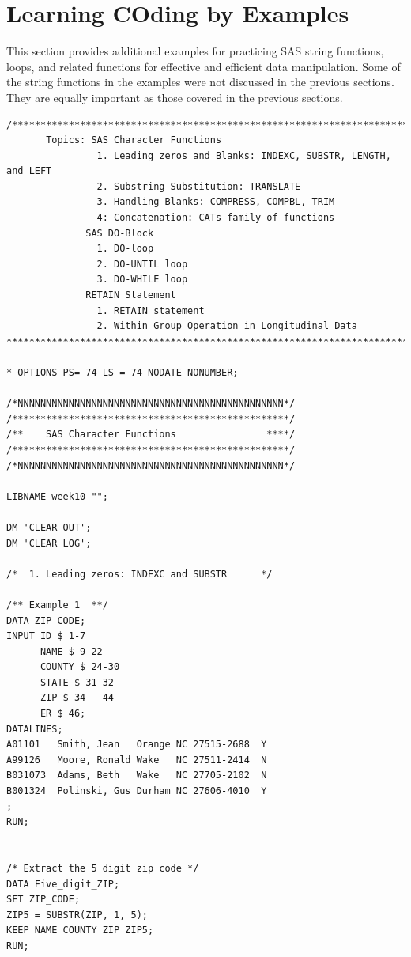 \documentclass[
]{book}
\begin{document}
\hypertarget{learning-coding-by-examples-6}{%
\section{Learning COding by Examples}\label{learning-coding-by-examples-6}}

This section provides additional examples for practicing SAS string functions, loops, and related functions for effective and efficient data manipulation. Some of the string functions in the examples were not discussed in the previous sections. They are equally important as those covered in the previous sections.

\begin{verbatim}
/******************************************************************************
       Topics: SAS Character Functions
                1. Leading zeros and Blanks: INDEXC, SUBSTR, LENGTH, and LEFT
                2. Substring Substitution: TRANSLATE
                3. Handling Blanks: COMPRESS, COMPBL, TRIM
                4: Concatenation: CATs family of functions
              SAS DO-Block
                1. DO-loop
                2. DO-UNTIL loop
                3. DO-WHILE loop
              RETAIN Statement
                1. RETAIN statement
                2. Within Group Operation in Longitudinal Data
*****************************************************************************/

* OPTIONS PS= 74 LS = 74 NODATE NONUMBER;

/*NNNNNNNNNNNNNNNNNNNNNNNNNNNNNNNNNNNNNNNNNNNNNNN*/
/*************************************************/
/**    SAS Character Functions                ****/
/*************************************************/
/*NNNNNNNNNNNNNNNNNNNNNNNNNNNNNNNNNNNNNNNNNNNNNNN*/

LIBNAME week10 "";

DM 'CLEAR OUT';
DM 'CLEAR LOG';

/*  1. Leading zeros: INDEXC and SUBSTR      */

/** Example 1  **/
DATA ZIP_CODE;
INPUT ID $ 1-7
      NAME $ 9-22
      COUNTY $ 24-30
      STATE $ 31-32
      ZIP $ 34 - 44
      ER $ 46;
DATALINES;
A01101   Smith, Jean   Orange NC 27515-2688  Y
A99126   Moore, Ronald Wake   NC 27511-2414  N
B031073  Adams, Beth   Wake   NC 27705-2102  N
B001324  Polinski, Gus Durham NC 27606-4010  Y
;
RUN;


/* Extract the 5 digit zip code */
DATA Five_digit_ZIP;
SET ZIP_CODE;
ZIP5 = SUBSTR(ZIP, 1, 5);
KEEP NAME COUNTY ZIP ZIP5;
RUN;


\end{verbatim}
\end{document}
